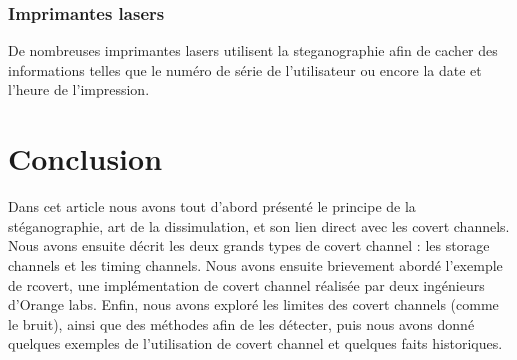 \documentclass{acm_proc_article-sp}
\begin{document}
\subsubsection{Imprimantes lasers}
De nombreuses imprimantes lasers utilisent la steganographie afin de cacher des informations telles que le numéro de série de l'utilisateur ou encore la date et l'heure de l'impression. 


\section{Conclusion}
Dans cet article nous avons tout d'abord présenté le principe de la stéganographie, art de la dissimulation, et son lien direct avec les covert channels. Nous avons ensuite décrit les deux grands types de covert channel : les storage channels et les timing channels. Nous avons ensuite brievement abordé l'exemple de rcovert, une implémentation de covert channel réalisée par deux ingénieurs d'Orange labs. Enfin, nous avons exploré les limites des covert channels (comme le bruit), ainsi que des méthodes afin de les détecter, puis nous avons donné quelques exemples de l'utilisation de covert channel et quelques faits historiques.




%
% 
%
%


\nocite{*}

\balancecolumns
\end{document}
